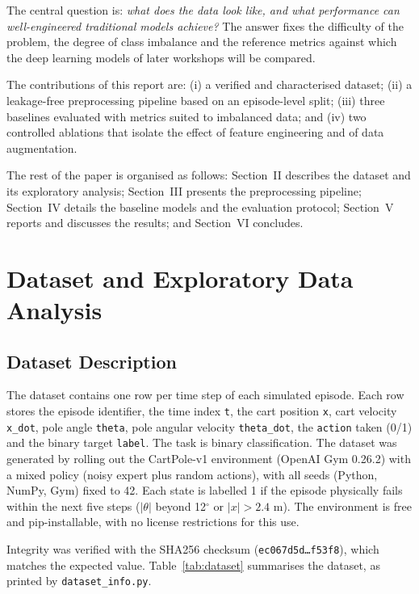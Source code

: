 \documentclass[conference]{IEEEtran}
\begin{document}
The central question is: \emph{what does the data look like, and what performance can
well-engineered traditional models achieve?} The answer fixes the difficulty of the
problem, the degree of class imbalance and the reference metrics against which the deep
learning models of later workshops will be compared.

The contributions of this report are: (i) a verified and characterised dataset;
(ii) a leakage-free preprocessing pipeline based on an episode-level split;
(iii) three baselines evaluated with metrics suited to imbalanced data; and
(iv) two controlled ablations that isolate the effect of feature engineering and of data
augmentation.

The rest of the paper is organised as follows: Section~II describes the dataset and its
exploratory analysis; Section~III presents the preprocessing pipeline; Section~IV details
the baseline models and the evaluation protocol; Section~V reports and discusses the
results; and Section~VI concludes.

\section{Dataset and Exploratory Data Analysis}

\subsection{Dataset Description}
The dataset contains one row per time step of each simulated episode. Each row stores the
episode identifier, the time index \texttt{t}, the cart position \texttt{x}, cart velocity
\texttt{x\_dot}, pole angle \texttt{theta}, pole angular velocity \texttt{theta\_dot}, the
\texttt{action} taken (0/1) and the binary target \texttt{label}. The task is binary
classification. The dataset was generated by rolling out the CartPole-v1 environment
(OpenAI Gym 0.26.2) with a mixed policy (noisy expert plus random actions), with all
seeds (Python, NumPy, Gym) fixed to 42.
Each state is labelled 1 if the episode physically fails within the next five steps
($|\theta|$ beyond 12$^\circ$ or $|x|>2.4$ m). The environment is free and pip-installable,
with no license restrictions for this use.

Integrity was verified with the SHA256 checksum
(\texttt{ec067d5d\dots f53f8}), which matches the expected value. Table~\ref{tab:dataset}
summarises the dataset, as printed by \texttt{dataset\_info.py}.
\end{document}
